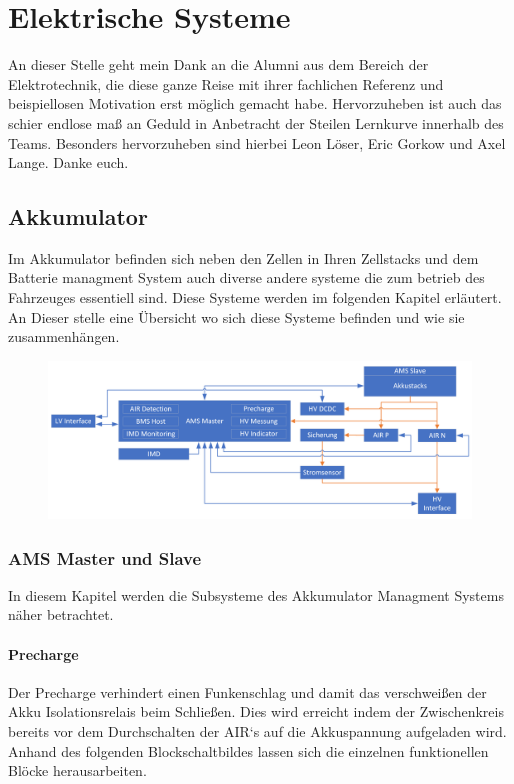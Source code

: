 
\chapter{Elektrische Systeme}
An dieser Stelle geht mein Dank an die Alumni aus dem Bereich der Elektrotechnik, die diese ganze Reise mit ihrer fachlichen Referenz und beispiellosen Motivation erst möglich gemacht habe. Hervorzuheben ist auch das schier endlose maß an Geduld in Anbetracht der Steilen Lernkurve innerhalb des Teams. Besonders hervorzuheben sind hierbei Leon Löser, Eric Gorkow und Axel Lange. Danke euch.
\FloatBarrier
\section{Akkumulator}
Im Akkumulator befinden sich neben den Zellen in Ihren Zellstacks und dem Batterie managment System auch diverse andere systeme die zum betrieb des Fahrzeuges essentiell sind. Diese Systeme werden im folgenden Kapitel erläutert. An Dieser stelle eine Übersicht wo sich diese Systeme befinden und wie sie zusammenhängen.

\begin{figure}
	\centering
	\includegraphics[width=0.7\linewidth]{"bilder/Accumulator Layout"}
	\caption{}
	\label{fig:accumulator-layout}
\end{figure}

\FloatBarrier

\subsection{AMS Master und Slave}
In diesem Kapitel werden die Subsysteme des Akkumulator Managment Systems näher betrachtet.
\FloatBarrier

\subsubsection{Precharge}
Der Precharge verhindert einen Funkenschlag und damit das verschweißen der Akku Isolationsrelais beim Schließen. Dies wird erreicht indem der Zwischenkreis bereits vor dem Durchschalten der AIR`s auf die Akkuspannung aufgeladen wird. Anhand des folgenden Blockschaltbildes lassen sich die einzelnen funktionellen Blöcke herausarbeiten.

